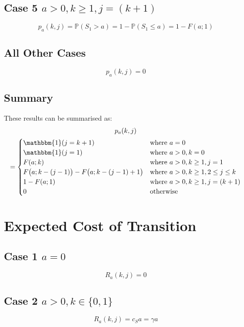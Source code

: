 \subsection{Case 5 $a > 0, k \geq 1, j = (k + 1)$}
\begin{equation*}
	p_{a} (k, j) = \mathbb{P} (S_{1} > a) = 1 - \mathbb{P} (S_{1} \leq a) = 1 - F (a; 1)
\end{equation*}

\subsection{All Other Cases}
\begin{equation*}
	p_{a} (k, j) = 0
\end{equation*}

\subsection{Summary}
These results can be summarised as:
\begin{multline}
	p_{a} (k, j) \\
	= \begin{cases}
		\mathbbm{1} (j = k + 1) & \text{where $a = 0$} \\
		\mathbbm{1} (j = 1) & \text{where $a > 0, k = 0$} \\
		F (a; k) & \text{where $a > 0, k \geq 1, j = 1$} \\
		F \big( a; k - (j - 1) \big) - F \big( a; k - (j - 1) + 1 \big) & \text{where $a > 0, k \geq 1, 2 \leq j \leq k$} \\
		1 - F (a; 1) & \text{where $a > 0, k \geq 1, j = (k + 1)$} \\
		0 & \text{otherwise}
	\end{cases}
\end{multline}

\section{Expected Cost of Transition}
\subsection{Case 1 $a = 0$}
\begin{equation*}
	R_{a} (k, j) = 0
\end{equation*}

\subsection{Case 2 $a > 0, k \in \{ 0, 1 \}$}
\begin{equation*}
	R_{a} (k, j) = c_{S} a = \gamma a
\end{equation*}

